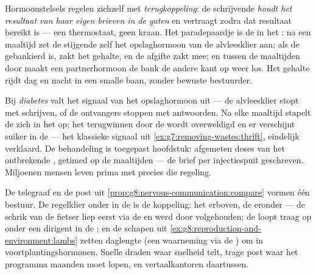 \begin{proposition}\label{prop:g8:hormonal-communication:feedback}
Hormoonstelsels regelen zichzelf met
\emph{terugkoppeling}: de schrijvende 
\emph{houdt het resultaat van haar eigen brieven in de gaten} en
vertraagt zodra dat resultaat bereikt is --- een thermostaat, geen kraan.
Het paradepaardje is de  in het : na een maaltijd zet de
stijgende  zelf het opslaghormoon van de alvleesklier aan; als de
 gebankierd is, zakt het gehalte, en de afgifte zakt mee; en tussen
de maaltijden door maakt een partnerhormoon de bank de andere kant op weer
los. Het gehalte rijdt dag en nacht in een smalle baan, zonder bewuste
bestuurder.
\end{proposition}
\admitted

\begin{example}\label{ex:g8:hormonal-communication:diabetes}
Bij \emph{diabetes} valt het signaal van het opslaghormoon
uit --- de alvleesklier stopt met schrijven, of de ontvangers stoppen met
antwoorden. Na elke maaltijd stapelt de  zich in het  op; het
terugwinnen door de  wordt overweldigd en er verschijnt suiker in de
 --- het klassieke signaal uit
\cref{ex:g7:removing-wastes:thrift}, eindelijk verklaard. De behandeling
is toegepast hoofdstuk: afgemeten doses van het ontbrekende , getimed
op de maaltijden --- de brief per injectiespuit geschreven. Miljoenen mensen
leven prima met precies die regeling.
\end{example}

\begin{remark}\label{rem:g8:hormonal-communication:partnership}
De telegraaf en de post uit
\cref{prop:g8:nervous-communication:compare} vormen één bestuur. De
regelklier onder in de  is de koppeling: het  erboven,
de  eronder --- de schrik van de fietser liep eerst via de 
en werd door  volgehouden; de  loopt traag op 
onder een dirigent in de ; en de schapen uit
\cref{ex:g8:reproduction-and-environment:lambs} zetten daglengte (een
waarneming via de ) om in voortplantingshormonen. Snelle draden waar
snelheid telt, trage post waar het programma maanden moet lopen, en
vertaalkantoren daartussen.
\end{remark}

